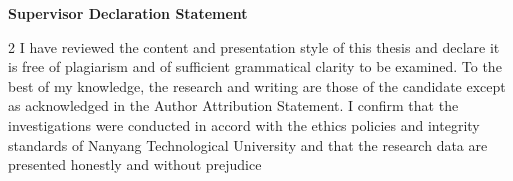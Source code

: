 \begin{titlepage}

\begin{center}
\Large{\bf{Supervisor Declaration Statement}}
\end{center}

\vspace{0.2in}

\begin{spacing}{2}
I have reviewed the content and presentation style of this thesis and declare it is free of plagiarism and of sufficient grammatical clarity to be examined. To the best of my knowledge, the research and writing are those of the candidate except as acknowledged in the Author Attribution Statement. I confirm that the investigations were conducted in accord with the ethics policies and integrity standards of Nanyang Technological University and that the research data are presented honestly and without prejudice
\end{spacing}

\vspace{2.5cm}

\begin{center}
	\makebox[4cm]{\dotfill}  \hfill \makebox[4cm]{\dotfill}\\
	      \hfill \makebox[4cm]{\supervisorname}
\end{center}
\end{titlepage}
\newpage